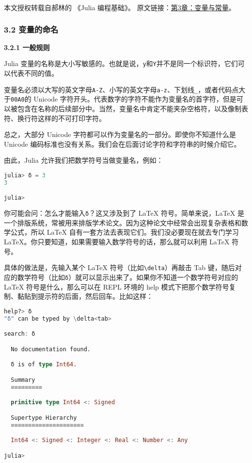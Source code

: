 
本文授权转载自郝林的 《Julia 编程基础》。 原文链接：\href{https://github.com/hyper0x/JuliaBasics/blob/master/book/ch03.md}{第3章：变量与常量}。


\subsubsection{3.2 变量的命名}

\textbf{3.2.1 一般规则}

Julia 变量的名称是大小写敏感的。也就是说，\verb|y|和\verb|Y|并不是同一个标识符，它们可以代表不同的值。

变量名必须以大写的英文字母\verb|A-Z|、小写的英文字母\verb|a-z|、下划线\verb|_|，或者代码点大于\verb|00A0|的 Unicode 字符开头。代表数字的字符不能作为变量名的首字符，但是可以被包含在名称的后续部分中。当然，变量名中肯定不能夹杂空格符，以及像制表符、换行符这样的不可打印字符。

总之，大部分 Unicode 字符都可以作为变量名的一部分。即使你不知道什么是 Unicode 编码标准也没有关系。我们会在后面讨论字符和字符串的时候介绍它。

由此，Julia 允许我们把数学符号当做变量名，例如：

\begin{lstlisting}[language=julia]
julia> δ = 3
3

julia> 
\end{lstlisting}

你可能会问：怎么才能输入\verb|δ|？这又涉及到了 LaTeX 符号。简单来说，LaTeX 是一个排版系统，常被用来排版学术论文。因为这种论文中经常会出现复杂表格和数学公式，所以 LaTeX 自有一套方法去表现它们。我们没必要现在就去专门学习 LaTeX。你只要知道，如果需要输入数学符号的话，那么就可以利用 LaTeX 符号。

具体的做法是，先输入某个 LaTeX 符号（比如\verb|\delta|）再敲击 Tab 键，随后对应的数学符号（比如\verb|δ|）就可以显示出来了。如果你不知道一个数学符号对应的 LaTeX 符号是什么，那么可以在 REPL 环境的 help 模式下把那个数学符号复制、黏贴到提示符的后面，然后回车。比如这样：

\begin{lstlisting}[language=julia]
help?> δ
"δ" can be typed by \delta<tab>

search: δ

  No documentation found.

  δ is of type Int64.

  Summary
  ≡≡≡≡≡≡≡≡≡

  primitive type Int64 <: Signed

  Supertype Hierarchy
  ≡≡≡≡≡≡≡≡≡≡≡≡≡≡≡≡≡≡≡≡≡

  Int64 <: Signed <: Integer <: Real <: Number <: Any

julia> 
\end{lstlisting}

